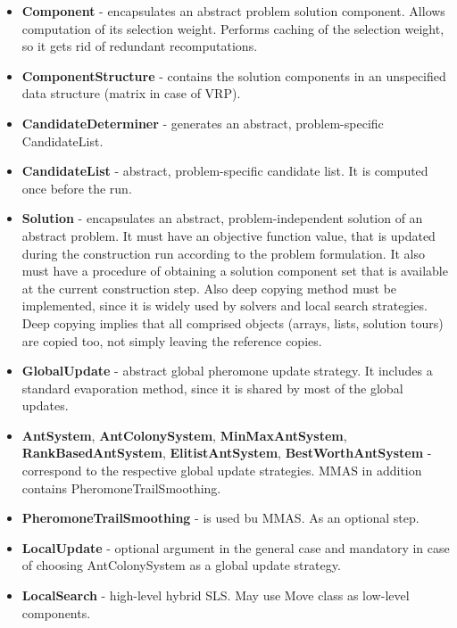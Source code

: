 \documentclass[11pt,a4paper,oneside]{book}
\begin{document}
\begin{itemize}
\item \textbf{Component} - encapsulates an abstract problem solution component. Allows computation of its selection weight. Performs caching of the selection weight, so it gets rid of redundant recomputations.

\item \textbf{ComponentStructure} - contains the solution components in an unspecified data structure (matrix in case of VRP).

\item \textbf{CandidateDeterminer} - generates an abstract, problem-specific CandidateList.

\item \textbf{CandidateList} - abstract, problem-specific candidate list. It is computed once before the run.

\item \textbf{Solution} - encapsulates an abstract, problem-independent solution of an abstract problem. It must have an objective function value, that is updated during the construction run according to the problem formulation. It also must have a procedure of obtaining a solution component set that is available at the current construction step. Also deep copying method must be implemented, since it is widely used by solvers and local search strategies. Deep copying implies that all comprised objects (arrays, lists, solution tours) are copied too, not simply leaving the reference copies.

\item \textbf{GlobalUpdate} - abstract global pheromone update strategy. It includes a standard evaporation method, since it is shared by most of the global updates.

\item \textbf{AntSystem}, \textbf{AntColonySystem}, \textbf{MinMaxAntSystem}, \textbf{RankBasedAntSystem}, \textbf{ElitistAntSystem}, \textbf{BestWorthAntSystem} - correspond to the respective global update strategies. MMAS in addition contains PheromoneTrailSmoothing.

\item \textbf{PheromoneTrailSmoothing} - is used bu MMAS. As an optional step.

\item \textbf{LocalUpdate} - optional argument in the general case and mandatory in case of choosing AntColonySystem as a global update strategy.

\item \textbf{LocalSearch} - high-level hybrid SLS. May use Move class as low-level components.


\end{itemize}
\end{document}
